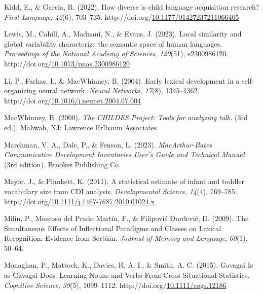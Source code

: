 \documentclass[10pt, letterpaper]{article}
\begin{document}
\begin{CSLReferences}{1}{0}
Kidd, E., \& Garcia, R. (2022). How diverse is child language
acquisition research? \emph{First Language}, \emph{42}(6), 703--735.
http://doi.org/\href{https://doi.org/10.1177/01427237211066405}{10.1177/01427237211066405}

Lewis, M., Cahill, A., Madnani, N., \& Evans, J. (2023). Local
similarity and global variability characterize the semantic space of
human languages. \emph{Proceedings of the National Academy of Sciences},
\emph{120}(51), e2300986120.
http://doi.org/\href{https://doi.org/10.1073/pnas.2300986120}{10.1073/pnas.2300986120}

Li, P., Farkas, I., \& MacWhinney, B. (2004). Early lexical development
in a self-organizing neural network. \emph{Neural Networks},
\emph{17}(8), 1345--1362.
http://doi.org/\href{https://doi.org/10.1016/j.neunet.2004.07.004}{10.1016/j.neunet.2004.07.004}

MacWhinney, B. (2000). \emph{The {CHILDES Project}: {Tools} for
analyzing talk.} (3rd ed.). {Mahwah, NJ}: {Lawrence Erlbaum Associates}.

Marchman, V. A., Dale, P., \& Fenson, L. (2023). \emph{{MacArthur-Bates
Communicative Development Inventories User}'s {Guide} and {Technical
Manual}} (3rd edition). {Brookes Publishing Co.}

Mayor, J., \& Plunkett, K. (2011). A statistical estimate of infant and
toddler vocabulary size from {CDI} analysis. \emph{Developmental
Science}, \emph{14}(4), 769--785.
http://doi.org/\href{https://doi.org/10.1111/j.1467-7687.2010.01024.x}{10.1111/j.1467-7687.2010.01024.x}

Milin, P., Moscoso del Prado Martín, F., \& Filipović Đurđević, D.
(2009). The {Simultaneous Effects} of {Inflectional Paradigms} and
{Classes} on {Lexical Recognition}: {Evidence} from {Serbian}.
\emph{Journal of Memory and Language}, \emph{60}(1), 50--64.

Monaghan, P., Mattock, K., Davies, R. A. I., \& Smith, A. C. (2015).
Gavagai {Is} as {Gavagai Does}: {Learning Nouns} and {Verbs From
Cross-Situational Statistics}. \emph{Cognitive Science}, \emph{39}(5),
1099--1112.
http://doi.org/\href{https://doi.org/10.1111/cogs.12186}{10.1111/cogs.12186}


\end{CSLReferences}
\end{document}
